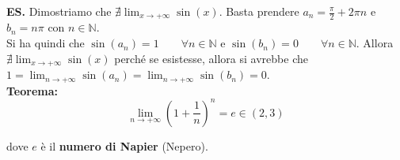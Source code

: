 \documentclass{article}
\begin{document}
\noindent\textbf{ES.} Dimostriamo che $\nexists \lim_{x \to +\infty} \sin(x)$. Basta prendere $a_n = \frac{\pi}{2} + 2\pi n$ e $b_n = n\pi$ con $n \in \mathbb{N}$.\\
Si ha quindi che $\sin(a_n) = 1 \qquad \forall n \in \mathbb{N}$ e $\sin(b_n) = 0 \qquad \forall n \in \mathbb{N}$. Allora $\nexists \lim_{x \to +\infty} \sin(x)$ perché se esistesse, allora si avrebbe che $1 = \lim_{n \to +\infty} \sin(a_n) = \lim_{n \to +\infty} \sin(b_n) = 0$.\\

\noindent\textbf{Teorema:}
\begin{equation*}
    \lim_{n \to +\infty} \left(1 + \frac{1}{n}\right)^n = e \in (2, 3)
\end{equation*}

\noindent dove $e$ è il \textbf{numero di Napier} (Nepero).
\end{document}
